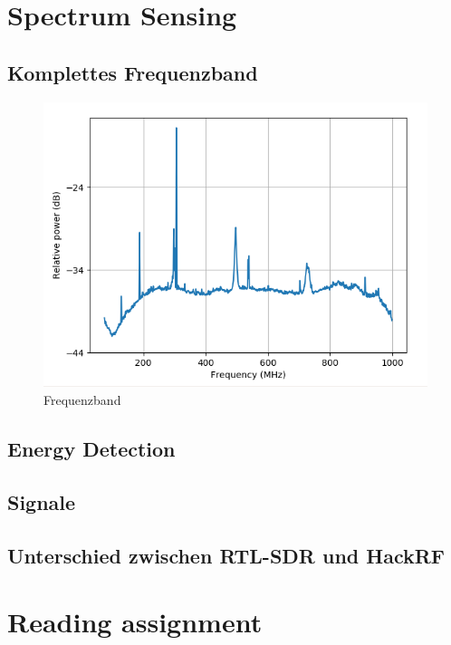 \documentclass[12pt,a4paper]{article}
\begin{document}
\section{Spectrum Sensing}

\subsection*{Komplettes Frequenzband}

\begin{figure}[hbt!]
	\centering
		\includegraphics[width=1\textwidth ]
		{Bilder/A3_full_frequency_band.png}
		\caption{Frequenzband}
\end{figure}



\subsection*{Energy Detection}

\subsection*{Signale}

\subsection*{Unterschied zwischen RTL-SDR und HackRF}

\newpage
\section{Reading assignment}
\end{document}
